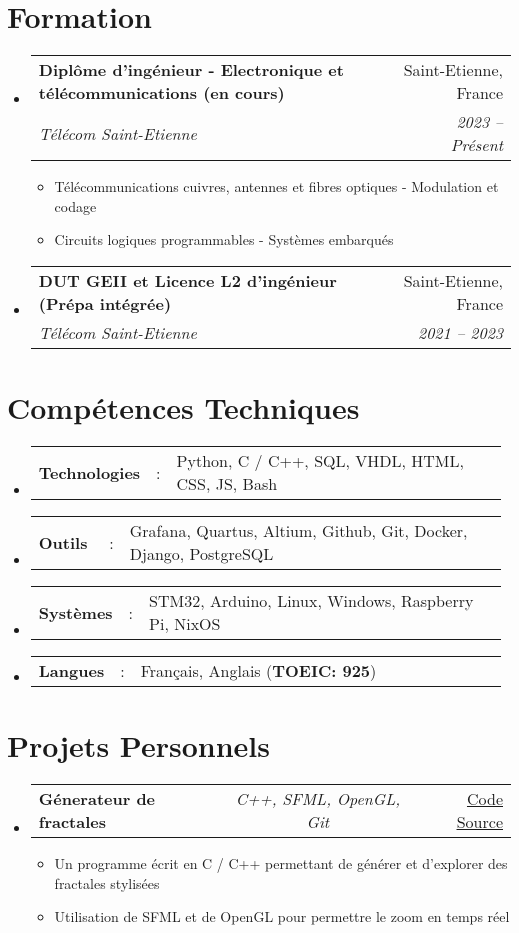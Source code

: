 \documentclass[a4paper,11pt]{article}
\makeatletter
\newcommand{\resumeItem}[1]{
  \item\small{#1} }
\newcommand{\resumeItemListStart}{\begin{itemize}[rightmargin=0.11in]}
\newcommand{\resumeItemListEnd}{\end{itemize}}
\newcommand{\resumeSectionType}[3]{
  \item\begin{tabular*}{0.995\textwidth}[t]{ p{0.15\linewidth}p{0.02\linewidth}p{0.81\linewidth} }
    \textbf{#1} & #2 & #3 \end{tabular*}\vspace{-4pt} }
\newcommand{\resumeTrioHeading}[3]{
  \item\small{
    \begin{tabular*}{0.995\textwidth}[t]{ l@{\extracolsep{\fill}}c@{\extracolsep{\fill}}r }
      \textbf{#1} & \textit{#2} & #3
    \end{tabular*}
  } }
\newcommand{\resumeQuadHeading}[4]{
  \item
  \begin{tabular*}{0.995\textwidth}[t]{l@{\extracolsep{\fill}}r} \textbf{#1} & #2 \\
    \textit{\small#3} & \textit{\small #4} \\
  \end{tabular*}
}
\newcommand{\resumeHeadingListStart}{
  \begin{itemize}[leftmargin=0.0in, label={}]
} \newcommand{\resumeHeadingListEnd}{\end{itemize}}
\makeatother
\begin{document}

\vspace{-15pt}
\section{Formation}
\resumeHeadingListStart{}
\resumeQuadHeading{Diplôme d'ingénieur - Electronique et télécommunications (en cours)}{Saint-Etienne, France} {Télécom Saint-Etienne}{2023 -- Présent}
\resumeItemListStart{}
\vspace{-5pt}
\resumeItem{Télécommunications cuivres, antennes et fibres optiques - Modulation et codage}
\resumeItem{Circuits logiques programmables - Systèmes embarqués}
\resumeItemListEnd{}
\resumeQuadHeading{DUT GEII et Licence L2 d'ingénieur (Prépa intégrée)}{Saint-Etienne, France}{Télécom Saint-Etienne}{2021 -- 2023}
\resumeHeadingListEnd{}


\vspace{-15pt}
\section{Compétences Techniques}
\resumeHeadingListStart{}
\resumeSectionType{Technologies}{:}{Python, C / C++, SQL, VHDL, HTML, CSS, JS, Bash}
\resumeSectionType{Outils}{:}{Grafana, Quartus, Altium, Github, Git, Docker, Django, PostgreSQL}
\resumeSectionType{Systèmes}{:}{STM32, Arduino, Linux, Windows, Raspberry Pi, NixOS}
\resumeSectionType{Langues}{:}{Français, Anglais (\textbf{TOEIC: 925})}
\resumeHeadingListEnd{}


\vspace{-10pt}
\section{Projets Personnels}
\resumeHeadingListStart{}
\resumeTrioHeading{Génerateur de fractales}{C++, SFML, OpenGL, Git}{\href{https://github.com/leoraclet/fractals}{\uline{Code Source}}}
\resumeItemListStart{}
\resumeItem{Un programme écrit en C / C++ permettant de générer et d'explorer des fractales stylisées}
\resumeItem{Utilisation de SFML et de OpenGL pour permettre le zoom en temps réel}
\resumeItemListEnd{}
\resumeHeadingListEnd{}
\end{document}
